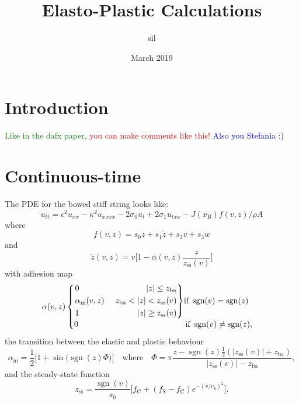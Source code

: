 \documentclass{article}
\title{Elasto-Plastic Calculations}
\author{sil }
\date{March 2019}
\newenvironment{rcases}
  {\left.\begin{alignedat}{2}}
  {\end{alignedat}\right\rbrace}
\DeclareMathOperator{\sgn}{sgn}
\def\SBcomment[#1]{\textcolor{Red}{#1}}
\def\SWcomment[#1]{\textcolor{Green}{#1}}
\def\SScomment[#1]{\textcolor{Blue}{#1}}
\begin{document}
\maketitle

\section{Introduction}
\SWcomment[Like in the dafx paper, ]\SBcomment[you can make comments like this!] \SScomment[Also you Stefania :)]
\section{Continuous-time}\label{sec:continuous}
The PDE for the bowed stiff string looks like:
\begin{equation}
    u_{tt} = c^2u_{xx}-\kappa^2u_{xxxx}-2\sigma_0u_t+2\sigma_1u_{txx}-J(x_\text{B})f(v,z)/\rho A
\end{equation}
where
\begin{equation}
    f(v, z) = s_0z + s_1\dot z + s_2v + s_3w
\end{equation}
and 
\begin{equation}\label{eq:zdot}
    \dot z(v, z) = v\bigg[1-\alpha(v, z)\frac{z}{z_\text{ss}(v)}\bigg]
\end{equation}
with adhesion map
\begin{equation}\label{eq:alpha}
\alpha(v, z) 
    \begin{cases}
    \begin{rcases}
        &0 & |z| \leq z_\text{ba}\\
       &\alpha_\text{m}(v,z)&\quad \  z_\text{ba}<|z|<z_\text{ss}(v)\\
        &1 &|z|\geq z_\text{ss}(v)
        \end{rcases}\text{if}\  \sgn(v)=\sgn(z)\\
        0\qquad \qquad \qquad \qquad \qquad \qquad \quad \, \text{if}\  \sgn(v)\neq\sgn(z),
    \end{cases}
\end{equation}
the transition between the elastic and plastic behaviour
\begin{equation}
    \alpha_\text{m} = \frac{1}{2}\big[1+\sin\big(\sgn(z)\Phi\big)\big]\quad \text{where}\quad \Phi = \pi\frac{z-\sgn(z)\frac{1}{2}(|z_\text{ss}(v)|+z_\text{ba})}{|z_\text{ss}(v)|-z_\text{ba}},
\end{equation}
and the steady-state function
\begin{equation}\label{eq:zss}
    z_\text{ss} = \frac{\sgn(v)}{s_0}\Big[f_\text{C}+(f_\text{S}-f_\text{C})e^{-(v/v_\text{S})^2}\Big].
\end{equation}
\end{document}
